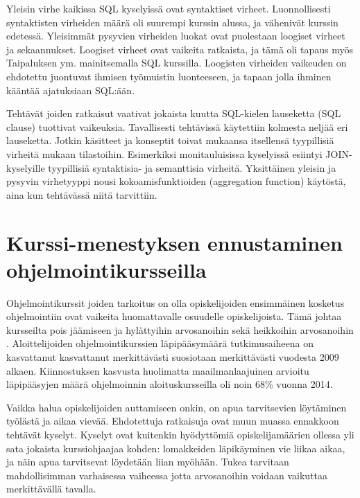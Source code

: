 \documentclass[finnish,twoside,openright]{HYgraduMLDS}
\begin{document}
Yleisin virhe kaikissa SQL kyselyissä ovat syntaktiset virheet\cite{Taipalus:2019:EFS:3287324.3287359}. Luonnollisesti syntaktisten virheiden määrä oli suurempi kurssin alussa, ja vähenivät kurssin edetessä. Yleisimmät pysyvien virheiden luokat ovat puolestaan loogiset virheet ja sekaannukset\cite{Taipalus:2019:EFS:3287324.3287359}. Loogiset virheet ovat vaikeita ratkaista, ja tämä oli tapaus myös Taipaluksen ym. \cite{Taipalus:2019:EFS:3287324.3287359} mainitsemalla SQL kurssilla. Loogisten virheiden vaikeuden on ehdotettu juontuvat ihmisen työmuistin luonteeseen, ja tapaan jolla ihminen kääntää ajatuksiaan SQL:ään\cite{SMELCER1995353}. 

Tehtävät joiden ratkaisut vaativat jokaista kuutta SQL-kielen lauseketta (SQL clause) tuottivat vaikeuksia\cite{Taipalus:2019:EFS:3287324.3287359}. Tavallisesti tehtävissä käytettiin kolmesta neljää eri lauseketta. Jotkin käsitteet ja konseptit toivat mukaansa itsellensä tyypillisiä virheitä mukaan tilastoihin. Esimerkiksi monitauluisissa kyselyissä esiintyi JOIN-kyselyille tyypillisiä syntaktisia- ja semanttisia virheitä. Yksittäinen yleisin ja pysyvin virhetyyppi nousi kokoamisfunktioiden (aggregation function) käytöstä, aina kun tehtävässä niitä tarvittiin. 


\section{Kurssi-menestyksen ennustaminen ohjelmointikursseilla}

Ohjelmointikurssit joiden tarkoitus on olla opiskelijoiden ensimmäinen kosketus ohjelmointiin ovat vaikeita huomattavalle osuudelle opiskelijoista. Tämä johtaa kursseilta pois jäämiseen ja hylättyihin arvosanoihin sekä heikkoihin arvosanoihin \cite{bergin2015using}. Aloittelijoiden ohjelmointikurssien läpipääsymäärä tutkimusaiheena on kasvattanut kasvattanut merkittävästi suosiotaan merkittävästi vuodesta 2009 alkaen\cite{hellas2018predicting}. Kiinnostuksen kasvusta huolimatta maailmanlaajuinen arvioitu läpipääsyjen määrä ohjelmoinnin aloituskursseilla oli noin 68\% vuonna 2014\cite{watson2014failure}. 

Vaikka halua opiskelijoiden auttamiseen onkin, on apua tarvitsevien löytäminen työlästä ja aikaa vievää. Ehdotettuja ratkaisuja ovat muun muassa ennakkoon tehtävät kyselyt\cite{watson2014no}. %
Kyselyt ovat kuitenkin hyödyttömiä opiskelijamäärien ollessa yli sata jokaista kurssiohjaajaa kohden: lomakkeiden läpikäyminen vie liikaa aikaa, ja näin apua tarvitsevat löydetään liian myöhään. Tukea tarvitaan mahdollisimman varhaisessa vaiheessa jotta arvosanoihin voidaan vaikuttaa merkittävällä tavalla\cite{bergin2015using}. 
\end{document}
